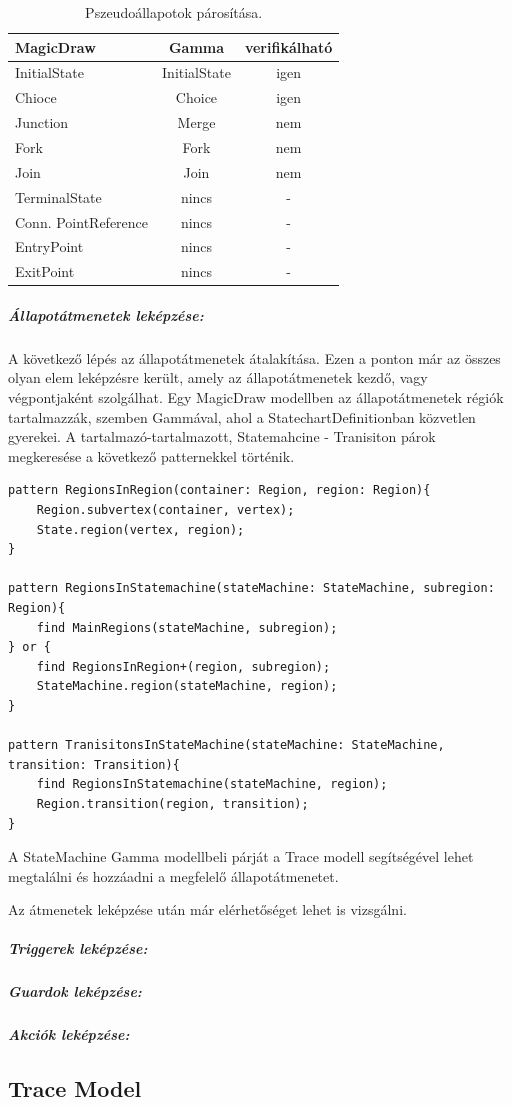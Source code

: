 \begin{table}[ht]
	\footnotesize
	\centering
	\begin{tabular}{ l c c }
		MagicDraw & Gamma & verifikálható \\ \hline
		InitialState & InitialState & igen \\
		Chioce & Choice & igen \\
		Junction & Merge & nem \\
		Fork & Fork & nem \\
		Join & Join & nem \\
		TerminalState & nincs & - \\
		Conn. PointReference & nincs & - \\
		EntryPoint & nincs & - \\
		ExitPoint & nincs & -
		
	\end{tabular}
	\caption{Pszeudoállapotok párosítása.}
	\label{table:pseudo}
\end{table}

\subparagraph{Állapotátmenetek leképzése:} A következő lépés az állapotátmenetek átalakítása. Ezen a ponton már az összes olyan elem leképzésre került, amely az állapotátmenetek kezdő, vagy végpontjaként szolgálhat. Egy MagicDraw modellben az állapotátmenetek régiók tartalmazzák, szemben Gammával, ahol a StatechartDefinitionban közvetlen gyerekei. A tartalmazó-tartalmazott, Statemahcine - Tranisiton párok megkeresése a következő patternekkel történik.
\begin{lstlisting}
pattern RegionsInRegion(container: Region, region: Region){
	Region.subvertex(container, vertex);
	State.region(vertex, region);
}

pattern RegionsInStatemachine(stateMachine: StateMachine, subregion: Region){
	find MainRegions(stateMachine, subregion);
} or {
	find RegionsInRegion+(region, subregion);
	StateMachine.region(stateMachine, region);
}

pattern TranisitonsInStateMachine(stateMachine: StateMachine, transition: Transition){
	find RegionsInStatemachine(stateMachine, region);
	Region.transition(region, transition);
}
\end{lstlisting}

A StateMachine Gamma modellbeli párját a Trace modell segítségével lehet megtalálni és hozzáadni a megfelelő állapotátmenetet.

Az átmenetek leképzése után már elérhetőséget lehet is vizsgálni.

\subparagraph{Triggerek leképzése:}

\subparagraph{Guardok leképzése:}

\subparagraph{Akciók leképzése:}

\subsection{Trace Model}

\label{sec:trace_model}
